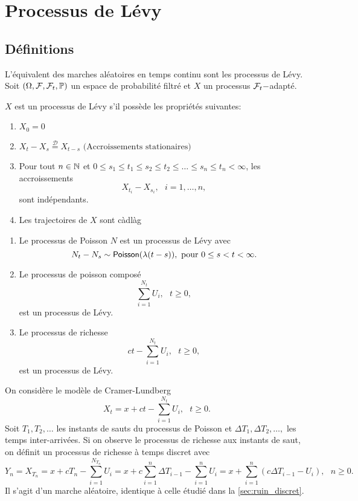 \section{Processus de Lévy}\label{sec:levy}
\subsection{Définitions}
L'équivalent des marches aléatoires en temps continu sont les processus de Lévy. Soit $(\Omega,\mathcal{F},\mathcal{F}_t,\mathbb{P})$ un espace de probabilité filtré et $X$ un processus $\mathcal{F}_t-$adapté.
\begin{definition}
$X$ est un processus de Lévy s'il possède les propriétés suivantes:
\begin{enumerate}
    \item $X_0 = 0$
    \item $X_t - X_s \overset{\mathcal{D}}{=}X_{t-s}\text{ (Accroissements stationaires)}$
    \item Pour tout $n\in\mathbb{N}$ et $0\leq s_1\leq t_1\leq s_2\leq t_2\leq \ldots\leq s_n\leq t_n<\infty$, les accroissements
    $$
    X_{t_i}-X_{s_i},\text{ }i = 1,\ldots, n,
    $$
    sont indépendants.
    \item Les trajectoires de $X$ sont càdlàg
\end{enumerate}
\end{definition}
\begin{ex}
\begin{enumerate}
    \item Le processus de Poisson $N$ est un processus de Lévy avec 
    $$
    N_t - N_s\sim\mathsf{Poisson}(\lambda(t-s)),\text{ pour }0\leq s<t<\infty.
    $$
    \item Le processus de poisson composé 
    $$
    \sum_{i = 1}^{N_t}U_i, \text{ }t\geq 0,
    $$
    est un processus de Lévy.
    \item Le processus de richesse
    $$
    ct-\sum_{i = 1}^{N_t}U_i,\text{ }t\geq 0,
    $$
    est un processus de Lévy.
\end{enumerate}
\end{ex}
\begin{remark}
On considère le modèle de Cramer-Lundberg 
$$
X_t = x +ct-\sum_{i = 1}^{N_t}U_i,\text{ }t\geq 0.
$$
Soit $T_1,T_2,\ldots$ les instants de sauts du processus de Poisson et $\Delta T_1,\Delta T_2,\ldots, $ les temps inter-arrivées. Si on observe le processus de richesse aux instants de saut, on définit un processus de richesse à temps discret avec 
$$
Y_n = X_{T_n} = x +cT_n -\sum_{i = 1}^{N_{T_n}}U_i = x +c\sum_{i = 1}^{n}\Delta T_{i-1} -\sum_{i = 1}^{n}U_i = x +\sum_{i = 1}^{n}(c\Delta T_{i-1} -U_i),\text{ }n\geq 0 .
$$
Il s'agit d'un marche aléatoire, identique à celle étudié dans la \cref{sec:ruin_discret}.
\end{remark}
